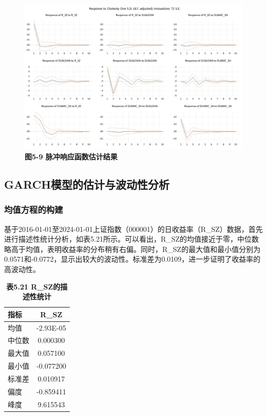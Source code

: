 \documentclass[12pt, a4paper]{article}
\numberwithin{equation}{section}
\begin{document}
\begin{figure}[h!]
    \centering
    \includegraphics[width=\textwidth]{./img/impulse.png}
    \captionsetup{labelformat=empty}
    \caption{\textbf{\fontsize{9pt}{11pt}\selectfont 图5-9 脉冲响应函数估计结果}}
\end{figure}

\subsection{GARCH模型的估计与波动性分析}
\subsubsection{均值方程的构建}

基于2016-01-01至2024-01-01上证指数（000001）的日收益率（R\_SZ）数据，首先进行描述性统计分析，如表5.21所示。可以看出，R\_SZ的均值接近于零，中位数略高于均值，表明收益率的分布稍有右偏。同时，R\_SZ的最大值和最小值分别为0.0571和-0.0772，显示出较大的波动性。标准差为0.0109，进一步证明了收益率的高波动性。

\begin{table}[h!]
    \centering
    \captionsetup{labelformat=empty}
    \caption{\textbf{\fontsize{9pt}{11pt}\selectfont 表5.21 R\_SZ的描述性统计}}
    \begin{tabular}{lc}
        \toprule
        指标  & R\_SZ     \\
        \midrule
        均值  & -2.93E-05 \\
        中位数 & 0.000300  \\
        最大值 & 0.057100  \\
        最小值 & -0.077200 \\
        标准差 & 0.010917  \\
        偏度  & -0.859411 \\
        峰度  & 9.615543  \\
        \bottomrule
    \end{tabular}
\end{table}
\end{document}
